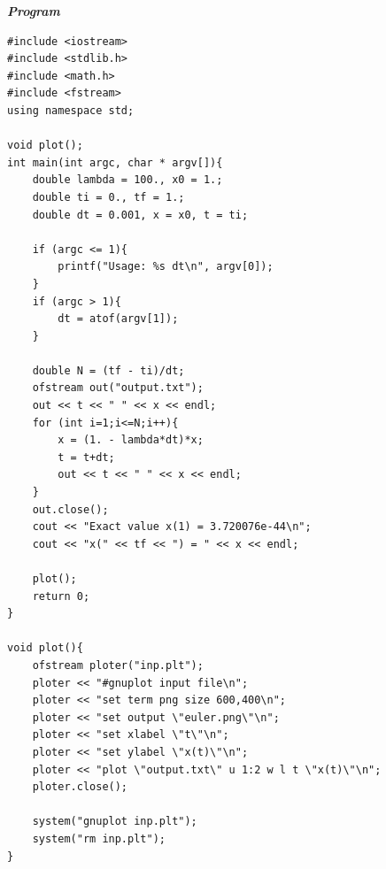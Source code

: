 \documentclass[paper=a4, fontsize=11pt]{scrartcl}
\numberwithin{equation}{section} %
\numberwithin{figure}{section} %
\numberwithin{table}{section} %
\begin{document}
\newpage
\textit{\textbf{Program}}
\lstset{frameround=fttt}
\begin{lstlisting}
#include <iostream>
#include <stdlib.h>
#include <math.h>
#include <fstream>
using namespace std;

void plot();
int main(int argc, char * argv[]){
    double lambda = 100., x0 = 1.;
    double ti = 0., tf = 1.;
    double dt = 0.001, x = x0, t = ti;
    
    if (argc <= 1){
        printf("Usage: %s dt\n", argv[0]);
    }
    if (argc > 1){
        dt = atof(argv[1]);
    }
         
    double N = (tf - ti)/dt;
    ofstream out("output.txt");
    out << t << " " << x << endl;
    for (int i=1;i<=N;i++){
        x = (1. - lambda*dt)*x;
        t = t+dt;
        out << t << " " << x << endl;
    }
    out.close();
    cout << "Exact value x(1) = 3.720076e-44\n"; 
    cout << "x(" << tf << ") = " << x << endl;
   
    plot();
    return 0;
}

void plot(){
    ofstream ploter("inp.plt");
    ploter << "#gnuplot input file\n";
    ploter << "set term png size 600,400\n";
    ploter << "set output \"euler.png\"\n";
    ploter << "set xlabel \"t\"\n";
    ploter << "set ylabel \"x(t)\"\n";
    ploter << "plot \"output.txt\" u 1:2 w l t \"x(t)\"\n";
    ploter.close();

    system("gnuplot inp.plt");
    system("rm inp.plt");
}
\end{lstlisting}
\end{document}
